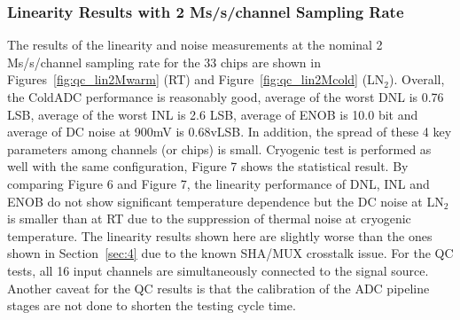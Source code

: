 \subsubsection{Linearity Results with 2 Ms/s/channel Sampling Rate}
The results of the linearity and noise measurements at the nominal 2 Ms/s/channel sampling rate for the 33 chips are shown in 
Figures~\ref{fig:qc_lin2Mwarm} (RT) and Figure~\ref{fig:qc_lin2Mcold} (LN$_2$). 
Overall, the ColdADC performance is reasonably good, average of the worst DNL is 0.76 LSB, average of the worst INL is 2.6 LSB, 
average of ENOB is 10.0 bit and average of DC noise at 900mV is 0.68vLSB. In addition, the spread of these 4 key parameters 
among channels (or chips) is small.
Cryogenic test is performed as well with the same configuration,  Figure 7 shows the statistical result. 
By comparing Figure 6 and Figure 7, the linearity  performance of DNL, INL and ENOB do not show significant temperature dependence
 but the DC noise at LN$_2$ is smaller than at RT due to the suppression of thermal noise at cryogenic temperature.  
The linearity results shown here are slightly worse than the ones shown in Section~\ref{sec:4} due to the known SHA/MUX crosstalk issue.
For the QC tests, all 16 input channels are simultaneously connected to the signal source.
Another caveat for the QC results is that the calibration of the ADC pipeline stages are not done to shorten the testing cycle time.

